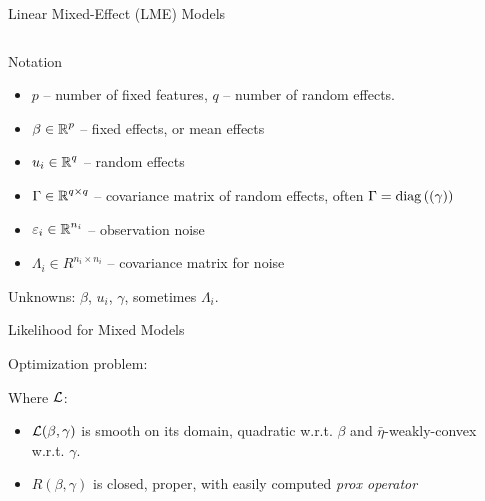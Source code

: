 \documentclass[8pt]{beamer}
\begin{document}
\begin{frame}{Linear Mixed-Effect (LME) Models}
\begin{columns}[T,onlytextwidth]
   	
  \end{columns}
\end{frame}

\begin{frame}{Notation}
   	
   	\begin{itemize}
   		\item $p$ -- number of fixed features, $q$ -- number of random effects.
   		\item $\beta \in \operatorname{\mathbb{R}}^p$ -- fixed effects, or mean effects
   		\item $u_i \in \operatorname{\mathbb{R}}^q$ -- random effects
   		\item $\Gamma \in \operatorname{\mathbb{R}}^{q \times q}$ -- covariance matrix of random effects, often $\Gamma = \mathrm{diag}\left((\gamma)\right)$
   		\item $\varepsilon_i \in \operatorname{\mathbb{R}}^{n_i}$ -- observation noise
   		\item $\Lambda_i \in R^{n_i \times n_i}$ -- covariance matrix for noise
   	\end{itemize}
   	Unknowns: $\beta$, $u_i$, $\gamma$, sometimes $\Lambda_i$.
\end{frame}

\begin{frame}{Likelihood for Mixed Models}

Optimization problem:

Where $\operatorname{\mathcal{L}}$:


\begin{itemize}
	\item $\operatorname{\mathcal{L}}(\beta, \gamma)$ is smooth on its domain, quadratic w.r.t. $\beta$ and $\bar\eta$-weakly-convex w.r.t. $\gamma$.
	\item $R(\beta, \gamma)$ is closed, proper, with easily computed \textit{prox operator}
\end{itemize}

\end{frame}
\end{document}
